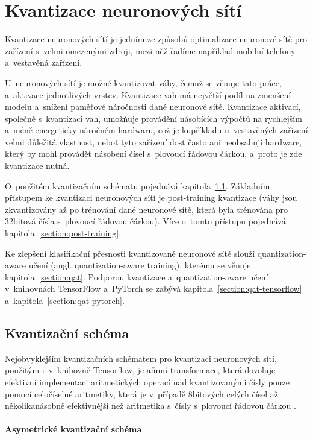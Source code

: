 \chapter{Kvantizace neuronových sítí}
\label{chapter:quantization}

Kvantizace neuronových sítí je jedním ze způsobů optimalizace neuronové sítě pro zařízení s~velmi omezenými zdroji, mezi něž řadíme například mobilní telefony a~vestavěná zařízení.

U~neuronových sítí je možné kvantizovat váhy, čemuž se věnuje tato práce, a~aktivace jednotlivých vrstev. Kvantizace vah má největší podíl na zmenšení modelu a~snížení paměťové náročnosti dané neuronové sítě. Kvantizace aktivací, společně s~kvantizací vah, umožňuje provádění násobících výpočtů na rychlejším a~méně energeticky náročném hardwaru, což je kupříkladu u~vestavěných zařízení velmi důležitá vlastnost, neboť tyto zařízení dost často ani neobsahují hardware, který by mohl provádět násobení čísel s~plovoucí řádovou čárkou, a~proto je zde kvantizace nutná.

O~použitém kvantizačním schématu pojednává kapitola~\ref{section:quantscheme}. Základním přístupem ke kvantizaci neuronových sítí je post-training kvantizace (váhy jsou zkvantizovány až po trénování dané neuronové sítě, která byla trénována pro 32bitová čísla s~plovoucí řádovou čárkou). Více o~tomto přístupu pojednává kapitola~\ref{section:post-training}.

Ke zlepšení klasifikační přesnosti kvantizované neuronové sítě slouží quantization-aware učení (angl. quantization-aware training), kterému se věnuje kapitola~\ref{section:qat}. Podporou kvantizace a~quantization-aware učení v~knihovnách TensorFlow a~PyTorch se zabývá kapitola~\ref{section:qat-tensorflow} a~kapitola~\ref{section:qat-pytorch}.

\section{Kvantizační schéma}
\label{section:quantscheme}

Nejobvyklejším kvantizačních schématem pro kvantizaci neuronových sítí, použitým i~v~kni\-hovně Tensorflow, je afinní transformace, která dovoluje efektivní implementaci aritmetických operací nad kvantizovanými čísly pouze pomocí celočíselné aritmetiky, která je v~případě 8bitových celých čísel až několikanásobně efektivnější než aritmetika s~čísly s~plovoucí řádovou čárkou \cite{Vaverka_2020, Sze2020-ke}. 

\subsubsection{Asymetrické kvantizační schéma}

